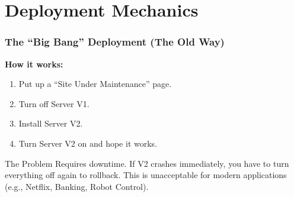 \documentclass[xcolor=table]{beamer}
\begin{document}
\section{Deployment Mechanics}

\begin{frame}
    \frametitle{The ``Big Bang'' Deployment (The Old Way)}
    \textbf{How it works:}
    \begin{enumerate}
        \item Put up a ``Site Under Maintenance'' page.
        \item Turn off Server V1.
        \item Install Server V2.
        \item Turn Server V2 on and hope it works.
    \end{enumerate}
    
    \vspace{0.3cm}
    \begin{alertblock}{The Problem}
        Requires downtime. If V2 crashes immediately, you have to turn everything off again to rollback. This is unacceptable for modern applications (e.g., Netflix, Banking, Robot Control).
    \end{alertblock}
\end{frame}
\end{document}
